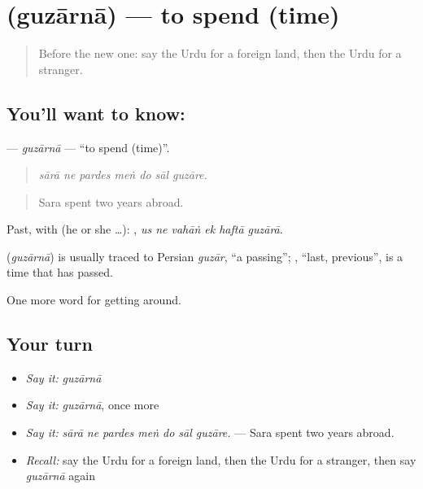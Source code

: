 \section[\texorpdfstring{\ur{گزارنا} (guzārnā)}{گزارنا (guzārnā)}]{ (guzārnā) — to spend (time)}

\label{lesson:UR-C400-guzarna}



\begin{quote}
Before the new one: say the Urdu for a foreign land, then the Urdu for a stranger.
\end{quote}

\subsection*{You'll want to know: }
\textbf{} — \emph{guzārnā} — \textquotedblleft{}to spend (time)\textquotedblright{}.

\begin{quote}
      
\end{quote}

\begin{quote}
\emph{sārā ne pardes meṅ do sāl guzāre.}
\end{quote}

\begin{quote}
Sara spent two years abroad.
\end{quote}

Past, with  (he or she …):      , \emph{us ne vahāṅ ek haftā guzārā}.

\begin{cousinweb}
\textbf{} (\emph{guzārnā}) is usually traced to Persian \emph{guzār}, \textquotedblleft{}a passing\textquotedblright{}; \textbf{}, \textquotedblleft{}last, previous\textquotedblright{}, is a time that has passed.
\end{cousinweb}

\begin{grammarlens}[title={What you've built}]
One more word for getting around.
\end{grammarlens}

\subsection*{Your turn}
\begin{itemize}
\raggedright
  \item \emph{Say it:} \emph{guzārnā}
  \item \emph{Say it:} \emph{guzārnā}, once more
  \item \emph{Say it:} \emph{sārā ne pardes meṅ do sāl guzāre.} — Sara spent two years abroad.
  \item \emph{Recall:} say the Urdu for a foreign land, then the Urdu for a stranger, then say \emph{guzārnā} again
\end{itemize}

